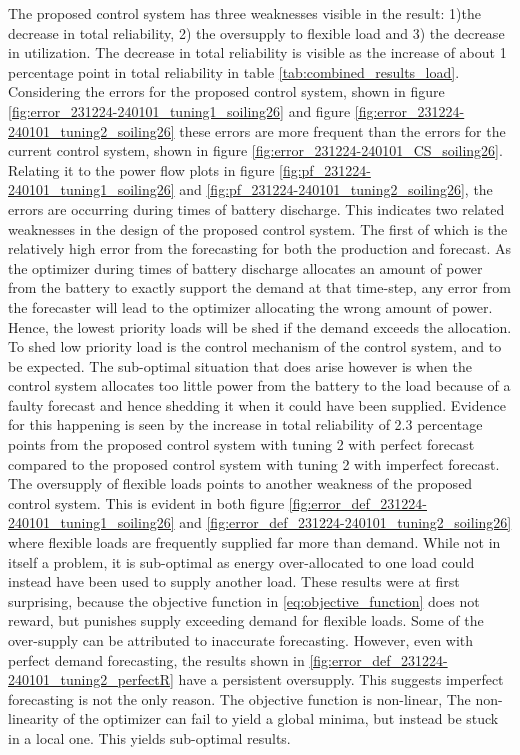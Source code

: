 The proposed control system has three weaknesses visible in the result: 1)the decrease in total reliability, 2) the oversupply to flexible load and 3) the decrease in utilization. The decrease in total reliability is visible as the increase of about 1 percentage point in total reliability in table \ref{tab:combined_results_load}. Considering the errors for the proposed control system, shown in figure \ref{fig:error_231224-240101_tuning1_soiling26} and figure \ref{fig:error_231224-240101_tuning2_soiling26} these errors are more frequent than the errors for the current control system, shown in figure \ref{fig:error_231224-240101_CS_soiling26}. Relating it to the power flow plots in figure \ref{fig:pf_231224-240101_tuning1_soiling26} and \ref{fig:pf_231224-240101_tuning2_soiling26}, the errors are occurring during times of battery discharge. This indicates two related weaknesses in the design of the proposed control system. The first of which is the relatively high error from the forecasting for both the production and forecast. As the optimizer during times of battery discharge allocates an amount of power from the battery to exactly support the demand at that time-step, any error from the forecaster will lead to the optimizer allocating the wrong amount of power. Hence, the lowest priority loads will be shed if the demand exceeds the allocation. To shed low priority load is the control mechanism of the control system, and to be expected. The sub-optimal situation that does arise however is when the control system allocates too little power from the battery to the load because of a faulty forecast and hence shedding it when it could have been supplied. Evidence for this happening is seen by the increase in total reliability of 2.3 percentage points from the proposed control system with tuning 2 with perfect forecast compared to the proposed control system with tuning 2 with imperfect forecast.\\

The oversupply of flexible loads points to another weakness of the proposed control system. This is evident in both figure \ref{fig:error_def_231224-240101_tuning1_soiling26} and \ref{fig:error_def_231224-240101_tuning2_soiling26} where flexible loads are frequently supplied far more than demand. While not in itself a problem, it is sub-optimal as energy over-allocated to one load could instead have been used to supply another load. These results were at first surprising, because the objective function in \ref{eq:objective_function} does not reward, but punishes supply exceeding demand for flexible loads. Some of the over-supply can be attributed to inaccurate forecasting. However, even with perfect demand forecasting, the results shown in \ref{fig:error_def_231224-240101_tuning2_perfectR} have a persistent oversupply. This suggests imperfect forecasting is not the only reason. The objective function is non-linear,  The non-linearity of the optimizer can fail to yield a global minima, but instead be stuck in a local one. This yields sub-optimal results.

